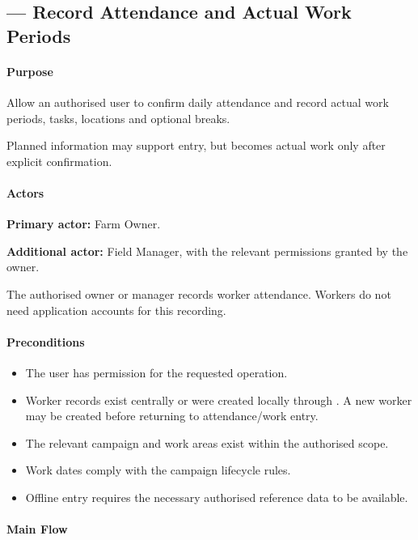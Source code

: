 \subsection{ --- Record Attendance and Actual Work Periods}
\label{uc:10}

\paragraph{Purpose}

Allow an authorised user to confirm daily attendance
and record actual work periods, tasks, locations
and optional breaks.

Planned information may support entry,
but becomes actual work only after
explicit confirmation.


\paragraph{Actors}

\textbf{Primary actor:} Farm Owner.

\textbf{Additional actor:} Field Manager,
with the relevant permissions granted by the owner.

The authorised owner or manager records worker attendance.
Workers do not need application accounts for this recording.

\paragraph{Preconditions}

\begin{itemize}
    \item The user has permission
    for the requested operation.
    \item Worker records exist centrally or were created locally through .
    A new worker may be created before returning to attendance/work entry.
    \item The relevant campaign and work areas
    exist within the authorised scope.
    \item Work dates comply with
    the campaign lifecycle rules.
    \item Offline entry requires the necessary
    authorised reference data to be available.
\end{itemize}

\paragraph{Main Flow}


